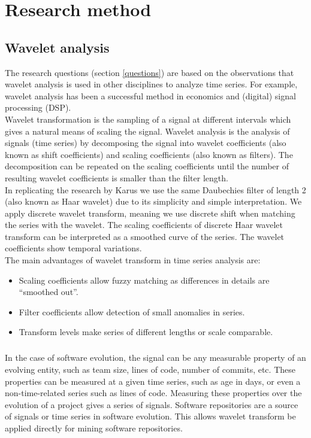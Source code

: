 \chapter{Research method}
\label{method}

\section{Wavelet analysis}
The research questions (section \ref{questions}) are based on the observations
that wavelet analysis is used in other disciplines to analyze time series. For
example, wavelet analysis has been a successful method in economics and
(digital) signal processing (DSP).\\

Wavelet transformation is the sampling of a signal at different intervals which
gives a natural means of scaling the signal. Wavelet analysis is the analysis of
signals (time series) by decomposing the signal into wavelet coefficients (also
known as shift coefficients) and scaling coefficients (also known as filters).
The decomposition can be repeated on the scaling coefficients until the number
of resulting wavelet coefficients is smaller than the filter length.\\

In replicating the research by Karus we use the same Daubechies filter of
length 2 (also known as Haar wavelet) due to its simplicity and simple interpretation.
We apply discrete wavelet transform, meaning we use discrete shift when matching
the series with the wavelet. The scaling coefficients of discrete Haar wavelet
transform can be interpreted as a smoothed curve of the series. The wavelet
coefficients show temporal variations.\\

\noindent
The main advantages of wavelet transform in time series analysis are:
\begin{itemize}
	\item Scaling coefficients allow fuzzy matching as differences in details are
	``smoothed out''.
	\item Filter coefficients allow detection of small anomalies in series.
	\item Transform levels make series of different lengths or scale comparable.
\end{itemize}

\paragraph{}
In the case of software evolution, the signal can be any measurable property
of an evolving entity, such as team size, lines of code, number of commits, etc.
These properties can be measured at a given time series, such as age in days,
or even a non-time-related series such as lines of code. Measuring these
properties over the evolution of a project gives a series of signals. Software
repositories are a source of signals or time series in software evolution. This
allows wavelet transform be applied directly for mining software repositories.

